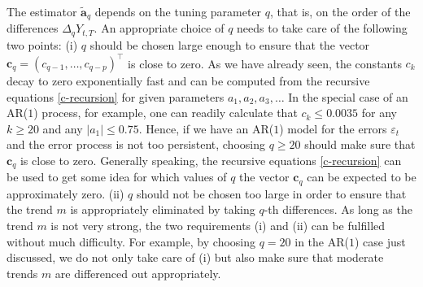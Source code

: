 The estimator $\widetilde{\boldsymbol{a}}_q$ depends on the tuning parameter $q$, that is, on the order of the differences $\Delta_q Y_{t,T}$. An appropriate choice of $q$ needs to take care of the following two points: 
(i) $q$ should be chosen large enough to ensure that the vector $\boldsymbol{c}_q = (c_{q-1},\dots,c_{q-p})^\top$ is close to zero. As we have already seen, the constants $c_k$ decay to zero exponentially fast and can be computed from the recursive equations \eqref{c-recursion} for given parameters $a_1,a_2,a_3,\ldots$ In the special case of an AR($1$) process, for example, one can readily calculate that $c_k \le 0.0035$ for any $k \ge 20$ and any $|a_1| \le 0.75$. Hence, if we have an AR($1$) model for the errors $\varepsilon_t$ and the error process is not too persistent, choosing $q \ge 20$ should make sure that $\boldsymbol{c}_q$ is close to zero. Generally speaking, the recursive equations \eqref{c-recursion} can be used to get some idea for which values of $q$ the vector $\boldsymbol{c}_q$ can be expected to be approximately zero. 
(ii) $q$ should not be chosen too large in order to ensure that the trend $m$ is appropriately eliminated by taking $q$-th differences. As long as the trend $m$ is not very strong, the two requirements (i) and (ii) can be fulfilled without much difficulty. For example, by choosing $q = 20$ in the AR($1$) case just discussed, we do not only take care of (i) but also make sure that moderate trends $m$ are differenced out appropriately. 


